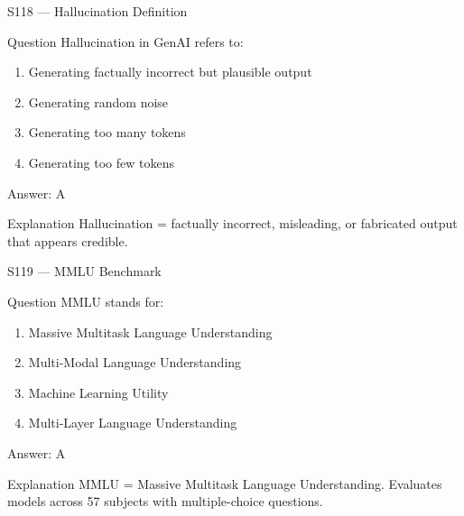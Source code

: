 \documentclass[aspectratio=169,8pt]{beamer}
\begin{document}
	\begin{frame}{S118 --- Hallucination Definition}
		\begin{block}{Question}
			Hallucination in GenAI refers to:
			\begin{enumerate}
				\item Generating factually incorrect but plausible output
				\item Generating random noise
				\item Generating too many tokens
				\item Generating too few tokens
			\end{enumerate}
		\end{block}
		\begin{exampleblock}{Answer: A}\end{exampleblock}
		\begin{block}{Explanation}
			Hallucination = factually incorrect, misleading, or fabricated output that appears credible.
		\end{block}
	\end{frame}
	
	\begin{frame}{S119 --- MMLU Benchmark}
		\begin{block}{Question}
			MMLU stands for:
			\begin{enumerate}
				\item Massive Multitask Language Understanding
				\item Multi-Modal Language Understanding
				\item Machine Learning Utility
				\item Multi-Layer Language Understanding
			\end{enumerate}
		\end{block}
		\begin{exampleblock}{Answer: A}\end{exampleblock}
		\begin{block}{Explanation}
			MMLU = Massive Multitask Language Understanding. Evaluates models across 57 subjects with multiple-choice questions.
		\end{block}
	\end{frame}
	
\end{document}

